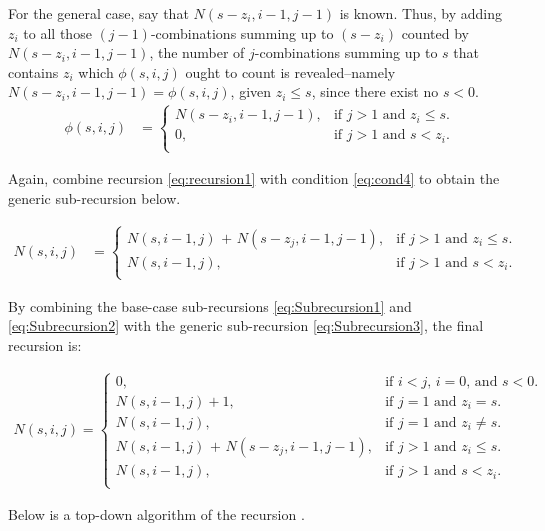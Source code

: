 \documentclass[a4paper,11pt]{article}
\begin{document}
For the general case, say that $N(s - z_{i},i-1,j-1)$ is known. Thus, by adding $z_{i}$ to all those $(j-1)$-combinations summing up to $(s - z_{i})$ counted by $N(s - z_{i},i-1,j-1)$, the number of $j$-combinations summing up to $s$ that contains $z_{i}$ which $\phi (s,i,j)$ ought to count is revealed–namely $N(s - z_{i},i-1,j-1)=\phi (s,i,j)$, given $z_{i} \leq s$, since there exist no $s<0$.
\begin{align}
\label{eq:cond4}
\phi (s,i,j) &=\begin{cases}
    N(s - z_{i},i-1,j-1), & \text{if $j>1$ and $z_{i} \leq s$}.\\
    0, & \text{if $j>1$ and $s < z_{i}$}.\\
  \end{cases}
\end{align}

Again, combine recursion \ref{eq:recursion1} with condition \ref{eq:cond4} to obtain the generic sub-recursion below.

\begin{align}
\label{eq:Subrecursion3}
N(s,i,j) &=\begin{cases}
    \text{$N(s,i-1,j)$ + $N(s-z_{j},i-1,j-1)$}, & \text{if $j>1$ and $z_{i} \leq s$}.\\
    \text{$N(s,i-1,j)$}, & \text{if $j>1$ and $s < z_{i}$}.\\
  \end{cases}
\end{align}

By combining the base-case sub-recursions \ref{eq:Subrecursion1} and \ref{eq:Subrecursion2} with the generic sub-recursion \ref{eq:Subrecursion3}, the final recursion is:

\begin{align}
\label{eq:finalRecursion}
\text{$N(s,i,j)$}   =\begin{cases}
    0, & \text{if $i < j$, $i=0$, and $s < 0$.} \\
    \text{$N(s,i-1,j)$}+1, & \text{if $j=1$ and $z_{i}=s$}.\\
    \text{$N(s,i-1,j)$}, & \text{if $j=1$ and $z_{i}\neq s$}. \\
    \text{$N(s,i-1,j)$ + $N(s-z_{j},i-1,j-1)$}, & \text{if $j>1$ and $z_{i} \leq s$}. \\
    \text{$N(s,i-1,j)$}, & \text{if $j>1$ and $s < z_{i}$}. \\
  \end{cases}
\end{align}

Below is a top-down algorithm of the recursion \label{eq:finalRecursion}.
\end{document}
